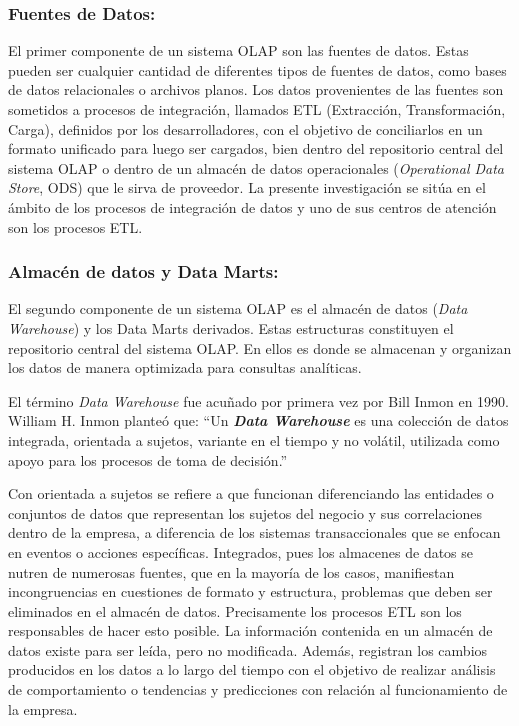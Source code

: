 \subsubsection{Fuentes de Datos:}
El primer componente de un sistema OLAP son las fuentes de datos. Estas pueden ser cualquier cantidad de diferentes 
tipos de fuentes de datos, como bases de datos relacionales o archivos planos. Los datos provenientes de las fuentes 
son sometidos a procesos de integración, llamados ETL (Extracción, Transformación, Carga), definidos por los desarrolladores, 
con el objetivo de conciliarlos en un formato unificado para luego ser cargados, bien dentro del repositorio central del sistema OLAP o 
dentro de un almacén de datos operacionales
(\emph{Operational Data Store}, ODS) que le sirva de proveedor. La presente investigación se sitúa en el ámbito de los 
procesos de integración de datos y uno de sus centros de atención son los procesos ETL.

\subsubsection{Almacén de datos y Data Marts:}
El segundo componente de un sistema OLAP es el almacén de datos (\emph{Data Warehouse}) y los Data Marts derivados. 
Estas estructuras constituyen el repositorio central 
del sistema OLAP. En ellos es donde se almacenan y 
organizan los datos de manera optimizada para consultas analíticas. 

El término \emph{Data Warehouse} fue acuñado por primera vez por Bill Inmon en 1990. William H. Inmon planteó que: 
“Un \textbf{\emph{Data Warehouse}} es una colección de datos integrada, orientada a sujetos, variante en el tiempo y 
no volátil, utilizada como apoyo para los procesos de toma de decisión.”

Con orientada a sujetos se refiere a que funcionan diferenciando las entidades o conjuntos de datos que representan 
los sujetos del negocio y sus correlaciones dentro de la empresa, a diferencia de los sistemas transaccionales que 
se enfocan en eventos o acciones específicas. Integrados, pues los almacenes de datos se nutren de numerosas fuentes, 
que en la mayor\'ia de los casos, manifiestan 
incongruencias en cuestiones de formato y estructura, problemas que deben ser eliminados en el 
almac\'en de datos. Precisamente los procesos ETL son los responsables de hacer esto posible. 
La información contenida en un almac\'en de datos existe para ser leída, pero no modificada. Adem\'as, registran 
los cambios producidos en los datos a lo largo del tiempo con el objetivo de realizar análisis de comportamiento 
o tendencias y predicciones con relación al funcionamiento de la empresa.


